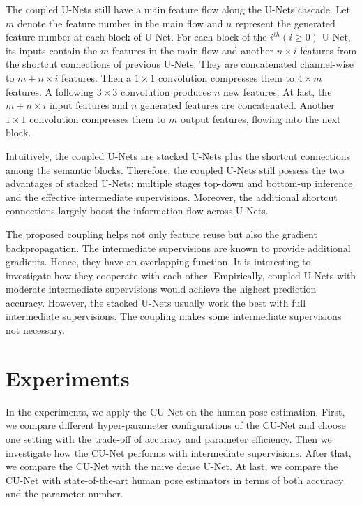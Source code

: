 \documentclass{bmvc2k}
\begin{document}
The coupled U-Nets still have a main feature flow along the U-Nets cascade. Let $m$ denote the feature number in the main flow and $n$ represent the generated feature number at each block of U-Net. For each block of the $i^{th}(i\geq 0)$ U-Net, its inputs contain the $m$ features in the main flow and another $n\times i$ features from the shortcut connections of previous U-Nets. They are concatenated channel-wise to $m+n\times i$ features. Then a $1\times 1$ convolution compresses them to $4\times m$ features. A following $3\times 3$ convolution produces $n$ new features. At last, the $m+n\times i$ input features and $n$ generated features are concatenated. Another $1\times 1$ convolution compresses them to $m$ output features, flowing into the next block.

Intuitively, the coupled U-Nets are stacked U-Nets plus the shortcut connections among the semantic blocks. Therefore, the coupled U-Nets still possess the two advantages of stacked U-Nets: multiple stages top-down and bottom-up inference and the effective intermediate supervisions. Moreover, the additional shortcut connections largely boost the information flow across U-Nets.

The proposed coupling helps not only feature reuse but also the gradient backpropagation. The intermediate supervisions are known to provide additional gradients. Hence, they have an overlapping function. It is interesting to investigate how they cooperate with each other. Empirically, coupled U-Nets with moderate intermediate supervisions would achieve the highest prediction accuracy. However, the stacked U-Nets usually work the best with full intermediate supervisions. The coupling makes some intermediate supervisions not necessary.







 \section{Experiments}
In the experiments, we apply the CU-Net on the human pose estimation. First, we compare different hyper-parameter configurations of the CU-Net and choose one setting with the trade-off of accuracy and parameter efficiency. Then we investigate how the CU-Net performs with intermediate supervisions. After that, we compare the CU-Net with the naive dense U-Net. At last, we compare the CU-Net with state-of-the-art human pose estimators in terms of both accuracy and the parameter number.
\end{document}
